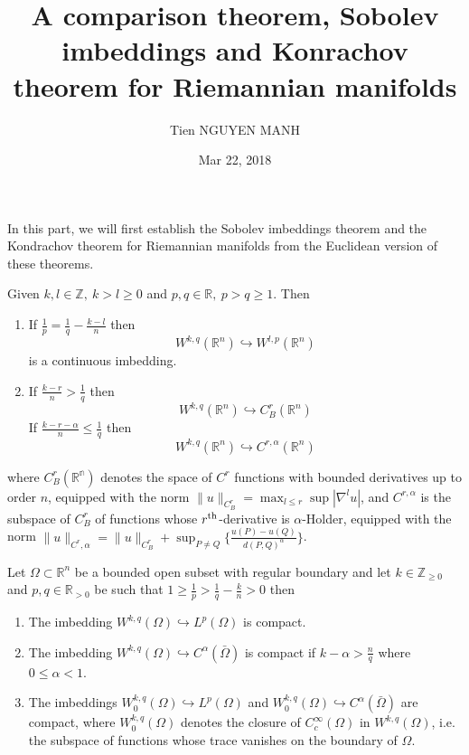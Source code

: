 \documentclass[11pt]{article}
\author{Tien NGUYEN MANH}
\date{Mar 22, 2018}
\title{A comparison theorem, Sobolev imbeddings and Konrachov theorem for Riemannian manifolds}
\begin{document}
\maketitle
\tableofcontents

In this part, we will first establish the Sobolev imbeddings theorem and the Kondrachov
theorem for Riemannian manifolds from the Euclidean version of these theorems.

\begin{theorem}
\label{thm:Sobolev-Rn}
Given \(k,l\in \mathbb{Z},\ k>l \geq 0\) and \(p,q\in \mathbb{R},\ p>q\geq 1\). Then
\begin{enumerate}
\item If \(\frac{1}{p}= \frac{1}{q} - \frac{k-l}{n}\) then 
\[
    W^{k,q}(\mathbb{R}^n) \hookrightarrow W^{l,p}(\mathbb{R}^n)
   \] is a continuous imbedding.
\item If \(\frac{k-r}{n}> \frac{1}{q}\) then
\[
   W^{k,q}(\mathbb{R}^n) \hookrightarrow C^r_B(\mathbb{R}^n)
   \]
If \(\frac{k-r-\alpha}{n}\leq \frac{1}{q}\) then 
\[ 
   W^{k,q}(\mathbb{R}^n) \hookrightarrow C^{r,\alpha}(\mathbb{R}^n) 
   \]
\end{enumerate}
where \(C^r_B(\mathbb{R^n})\) denotes the space of \(C^r\) functions with bounded
derivatives up to order \(n\), equipped with the norm \(\| u \|_{C^r_B} = \max_{l\leq
r}\sup|\nabla^l u|\), and \(C^{r,\alpha}\) is the subspace of \(C^r_B\) of functions
whose \(r^{\rm th}\)-derivative is \(\alpha\)-Holder, equipped with the norm \(\|
u\|_{C^r,\alpha} = \| u \|_{C^r_B} + \sup_{P\ne Q}\{ \frac{u(P) - u(Q)}{d(P,Q)^\alpha} \}\).
\end{theorem}

\begin{theorem}
\label{thm:Kondrachov-Rn}
Let \(\Omega\subset \mathbb{R}^n\) be a bounded open subset with regular boundary and
let \(k\in \mathbb{Z}_{\geq 0}\) and \(p,q\in \mathbb{R}_{>0}\) be such that
\(1\geq \frac{1}{p} > \frac{1}{q} - \frac{k}{n} > 0\) then
\begin{enumerate}
\item The imbedding \(W^{k,q}(\Omega) \hookrightarrow  L^p(\Omega)\) is compact.
\item The imbedding \(W^{k,q}(\Omega) \hookrightarrow  C^\alpha(\bar\Omega)\) is compact if
\(k-\alpha > \frac{n}{q}\) where \(0\leq \alpha < 1\).
\item The imbeddings \(W_0^{k,q}(\Omega) \hookrightarrow  L^p(\Omega)\) and \(W_0^{k,q}(\Omega) \hookrightarrow C^\alpha(\bar\Omega)\) are compact, where \(W_0^{k,q}(\Omega)\) denotes the closure of \(C_c^\infty(\Omega)\) in \(W^{k,q}(\Omega)\), i.e. the subspace of functions whose trace vanishes on the boundary
of \(\Omega\).
\end{enumerate}
\end{theorem}
\end{document}
